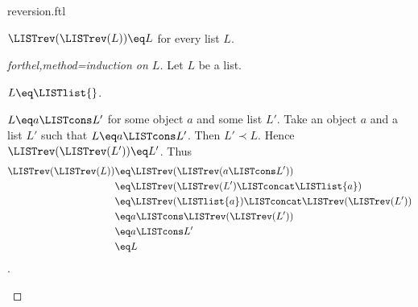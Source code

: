 \documentclass{naproche-library}
\begin{document}
\begin{smodule}[title=Reversion]{reversion.ftl}
\begin{proposition}[forthel,id=LISTS_REV_1021563255448756]
  $\LISTrev(\LISTrev(L)) \eq L$ for every list $L$.
\end{proposition}
\begin{proof}[forthel,method=induction on $L$]
  Let $L$ be a list.

  \begin{case}{$L \eq \LISTlist{}$.}\end{case}

  \begin{case}{$L \eq a \LISTcons L'$ for some object $a$ and some list $L'$.}
    Take an object $a$ and a list $L'$ such that $L \eq a \LISTcons L'$.
    Then $L' \prec L$.
    Hence $\LISTrev(\LISTrev(L')) \eq L'$.
    Thus
    \begin{align*}
      \LISTrev(\LISTrev(L))
        &\eq \LISTrev(\LISTrev(a \LISTcons L'))\\
        &\eq \LISTrev(\LISTrev(L') \LISTconcat \LISTlist{a})\\
        &\eq \LISTrev(\LISTlist{a}) \LISTconcat \LISTrev(\LISTrev(L'))\\
        &\eq a \LISTcons \LISTrev(\LISTrev(L'))\\
        &\eq a \LISTcons L'\\
        &\eq L
    \end{align*}.
  \end{case}
\end{proof}
\end{smodule}
\end{document}
